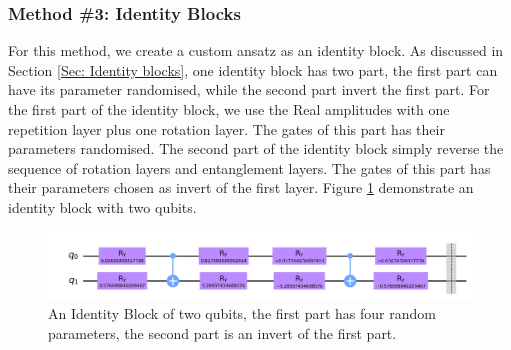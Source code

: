 \subsubsection{Method \#3: Identity Blocks} \label{Sec: Method3}
For this method, we create a custom ansatz as an identity block.
As discussed in Section \ref{Sec: Identity blocks}, one identity block has two part, the first part can have its parameter randomised, while the second part invert the first part.
For the first part of the identity block, we use the Real amplitudes with one repetition layer plus one rotation layer.
The gates of this part has their parameters randomised.
The second part of the identity block simply reverse the sequence of rotation layers and entanglement layers.
The gates of this part has their parameters chosen as invert of the first layer.
Figure \ref{Fig: Identity Ansatz Sample} demonstrate an identity block with two qubits.
\begin{figure}
    \centering
    \includegraphics[width=\textwidth]{Artefact/Appendices/ansatz-identity.png}
    \caption{An Identity Block of two qubits, the first part has four random parameters, the second part is an invert of the first part.}
    \label{Fig: Identity Ansatz Sample}
\end{figure}
